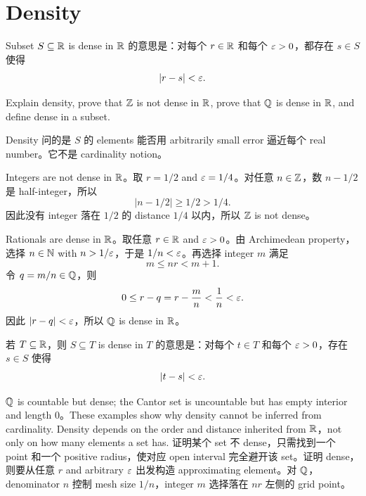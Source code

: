 \section{Density \optional}

\begin{definition}
Subset \(S\subseteq\mathbb{R}\) is dense in \(\mathbb{R}\) 的意思是：对每个 \(r\in\mathbb{R}\) 和每个
\(\varepsilon>0\)，都存在 \(s\in S\) 使得
\[
  |r-s|<\varepsilon.
\]
\end{definition}

\begin{exerciseblock}
Explain density, prove that \(\mathbb{Z}\) is not dense in \(\mathbb{R}\), prove that
\(\mathbb{Q}\) is dense in \(\mathbb{R}\), and define dense in a subset.
\end{exerciseblock}

\begin{solution}
Density 问的是 \(S\) 的 elements 能否用 arbitrarily small error 逼近每个
real number。它不是 cardinality notion。

Integers are not dense in \(\mathbb{R}\)。取 \(r=1/2\) and \(\varepsilon=1/4\)。对任意
\(n\in\mathbb{Z}\)，数 \(n-1/2\) 是 half-integer，所以
\[
  |n-1/2|\ge 1/2>1/4.
\]
因此没有 integer 落在 \(1/2\) 的 distance \(1/4\) 以内，所以 \(\mathbb{Z}\) is not
dense。

Rationals are dense in \(\mathbb{R}\)。取任意 \(r\in\mathbb{R}\) and \(\varepsilon>0\)。由
Archimedean property，选择 \(n\in\mathbb{N}\) with \(n>1/\varepsilon\)，于是
\(1/n<\varepsilon\)。再选择 integer \(m\) 满足
\[
  m\le nr<m+1.
\]
令 \(q=m/n\in\mathbb{Q}\)，则
\[
  0\le r-q=r-\frac{m}{n}<\frac1n<\varepsilon.
\]
因此 \(|r-q|<\varepsilon\)，所以 \(\mathbb{Q}\) is dense in \(\mathbb{R}\)。

若 \(T\subseteq\mathbb{R}\)，则 \(S\subseteq T\) is dense in \(T\) 的意思是：对每个
\(t\in T\) 和每个 \(\varepsilon>0\)，存在 \(s\in S\) 使得
\[
  |t-s|<\varepsilon.
\]
\end{solution}

\begin{explanation}
\(\mathbb{Q}\) is countable but dense; the Cantor set is uncountable but has empty
interior and length \(0\)。These examples show why density cannot be inferred
from cardinality. Density depends on the order and distance inherited from
\(\mathbb{R}\)，not only on how many elements a set has.
证明某个 set 不 dense，只需找到一个 point 和一个 positive radius，使对应
open interval 完全避开该 set。证明 dense，则要从任意 \(r\) and arbitrary
\(\varepsilon\) 出发构造 approximating element。对 \(\mathbb{Q}\)，denominator \(n\) 控制
mesh size \(1/n\)，integer \(m\) 选择落在 \(nr\) 左侧的 grid point。
\end{explanation}

